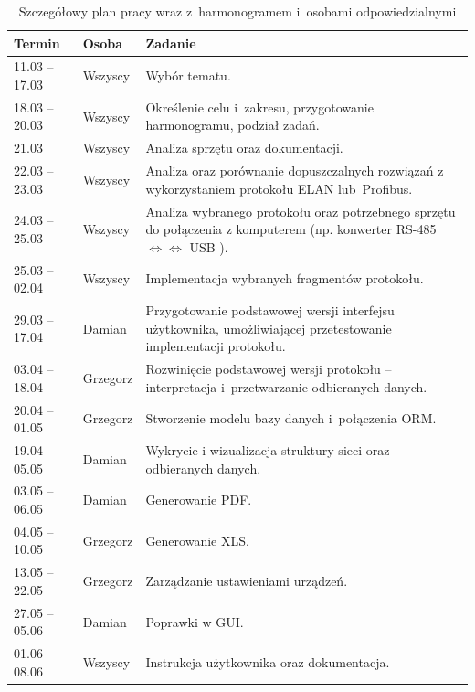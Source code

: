 \begin{table}[h]
\centering
\begin{tabular}{|p{}|p{}|p{}|}
\hline \textbf{Termin} & \textbf{Osoba} & \textbf{Zadanie} \\ 
\hline\hline 11.03 -- 17.03 & Wszyscy & Wybór tematu. \\ 
\hline 18.03 -- 20.03 & Wszyscy & Określenie celu i~zakresu, przygotowanie harmonogramu, podział zadań. \\ 
\hline 21.03 & Wszyscy & Analiza sprzętu oraz dokumentacji. \\ 
\hline 22.03 -- 23.03 & Wszyscy & Analiza oraz porównanie dopuszczalnych rozwiązań z wykorzystaniem protokołu ELAN lub~Profibus. \\ 
\hline 24.03 -- 25.03 & Wszyscy & Analiza wybranego protokołu oraz potrzebnego sprzętu do połączenia z komputerem (np. konwerter RS-485 $\Leftrightarrow\Leftrightarrow$ USB ). \\ 
\hline 25.03 -- 02.04 & Wszyscy & Implementacja wybranych fragmentów protokołu. \\ 
\hline 29.03 -- 17.04 & Damian & Przygotowanie podstawowej wersji interfejsu użytkownika, umożliwiającej przetestowanie implementacji protokołu. \\ 
\hline 03.04 -- 18.04 & Grzegorz & Rozwinięcie podstawowej wersji protokołu – interpretacja i~przetwarzanie odbieranych danych. \\ 
\hline 20.04 -- 01.05 & Grzegorz & Stworzenie modelu bazy danych i~połączenia ORM. \\ 
\hline 19.04 -- 05.05 & Damian & Wykrycie i wizualizacja struktury sieci oraz odbieranych danych. \\ 
\hline 03.05 -- 06.05 & Damian & Generowanie PDF. \\ 
\hline 04.05 -- 10.05 & Grzegorz  & Generowanie XLS. \\ 
\hline 13.05 -- 22.05 & Grzegorz & Zarządzanie ustawieniami urządzeń. \\ 
\hline 27.05 -- 05.06 & Damian & Poprawki w GUI. \\ 
\hline 01.06 -- 08.06 & Wszyscy & Instrukcja użytkownika oraz dokumentacja. \\ 
\hline 
\end{tabular} 
\caption{Szczegółowy plan pracy wraz z~harmonogramem i~osobami odpowiedzialnymi}
\label{tab:harmonogram}
\end{table}
